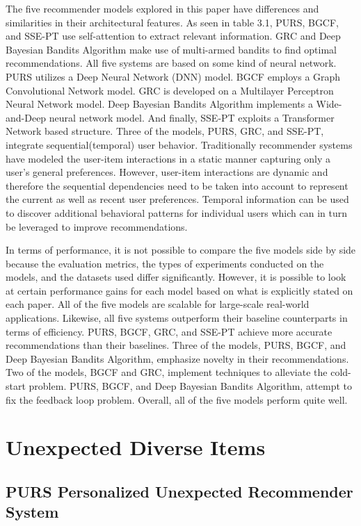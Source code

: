 The five recommender models explored in this paper have differences and similarities in their architectural features. As seen in table 3.1, PURS, BGCF, and SSE-PT use self-attention to extract relevant information. GRC and Deep Bayesian Bandits Algorithm make use of multi-armed bandits to find optimal recommendations. All five systems are based on some kind of neural network. PURS utilizes a Deep Neural Network (DNN) model. BGCF employs a Graph Convolutional Network model. GRC is developed on a Multilayer Perceptron Neural Network model. Deep Bayesian Bandits Algorithm implements a Wide-and-Deep neural network model. And finally, SSE-PT exploits a Transformer Network based structure. Three of the models, PURS, GRC, and SSE-PT, integrate sequential(temporal) user behavior. Traditionally recommender systems have modeled the user-item interactions in a static manner capturing only a user's general preferences. However, user-item interactions are dynamic and therefore the sequential dependencies need to be taken into account to represent the current as well as recent user preferences. Temporal information can be used to discover additional behavioral patterns for individual users which can in turn be leveraged to improve recommendations.

In terms of performance, it is not possible to compare the five models side by side because the evaluation metrics, the types of experiments conducted on the models, and the datasets used differ significantly. However, it is possible to look at certain performance gains for each model based on what is explicitly stated on each paper. All of the five models are scalable for large-scale real-world applications. Likewise, all five systems outperform their baseline counterparts in terms of efficiency. PURS, BGCF, GRC, and SSE-PT achieve more accurate recommendations than their baselines. Three of the models, PURS, BGCF, and Deep Bayesian Bandits Algorithm, emphasize novelty in their recommendations. Two of the models, BGCF and GRC, implement techniques to alleviate the cold-start problem. PURS, BGCF, and Deep Bayesian Bandits Algorithm, attempt to fix the feedback loop problem. Overall, all of the five models perform quite well. 

\chapter{Unexpected Diverse Items}
\section{PURS Personalized Unexpected Recommender System}

